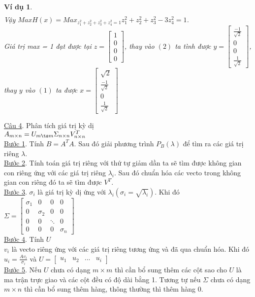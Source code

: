 \documentclass[12pt,a4paper]{book}
\newtheorem{vd}{Ví dụ}
\newcommand{\m}[1]{
\begin{bmatrix}
#1
\end{bmatrix}
}
\newcommand{\s}[1]{
\sqrt{#1}
}
\newcommand{\n}[1]{
\left(#1\right)
}
\begin{document}
\begin{vd}
\begin{align}
\end{align}
Vậy $Max H\n{x} = Max_{z_1^2 + z_2^2 + z_3^2 + z_4^2 = 1} z_1^2 + z_2^2 + z_3^2 - 3z_4^2 = 1$.\\
Giá trị max = 1 đạt được tại $z = \m{1\\0\\0\\0}$, thay vào $\n{2}$ ta tình được $y = \m{\frac{-1}{\s{2}}\\0\\0\\\frac{1}{\s{2}}}$, thay $y$ vào $\n{1}$ ta được $x = \m{\s{2}\\\frac{-1}{\s{2}}\\0\\\frac{1}{\s{2}}}$
\end{vd}
\underline{Câu 4}. Phân tích giá trị kỳ dị \\
$A_{m \times n} = U_{m \ts m} \Sigma_{n \times n} V^{T}_{n \times n}$\\
\underline{Bước 1}. Tính $B = A^{T}A$. Sau đó giải phương trình $P_B\n{\lambda}$ để tìm ra các giá trị riêng $\lambda$.\\
\underline{Bước 2}. Tính toán giá trị riêng với thứ tự giảm dần ta  sẽ tìm được không gian con riêng ứng với các giá trị riêng $\lambda_i$. Sau đó chuẩn hóa các vecto trong không gian con riêng đó ta sẽ tìm được $V^{T}$. \\
\underline{Bước 3}. $\sigma_i$ là giá trị kỳ dị ứng với $\lambda_i \n{\sigma_i = \s{\lambda_i}}$. Khi đó $\Sigma = \m{
\sigma_1 & 0 & 0 & 0\\
0 & \sigma_2 & 0 & 0 \\
0 & 0 & \ddots & 0 \\
0 & 0 & 0 & \sigma_{n}
}$ \\
\underline{Bước 4}. Tính $U$ \\
$v_i$ là vecto riêng ứng với các giá trị riêng tương ứng và đã qua chuẩn hóa. Khi đó $u_i = \frac{Av_i}{\sigma_i}$ và $U = \m{u_1 & u_2 & ... & u_i}$ \\
\underline{Bước 5}. Nếu $U$ chưa có dạng $m \times m$ thì cần bổ sung thêm các cột sao cho $U$ là ma trận trực giao và các cột đều có độ dài bằng 1. Tương tự nếu $\Sigma$ chưa có dạng $m \times n$ thì cần bổ sung thêm hàng, thông thường thì thêm hàng 0.
\end{document}
